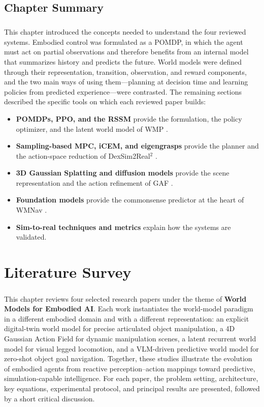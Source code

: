 \documentclass[12pt,a4paper,final]{extreport}
\begin{document}
\section{Chapter Summary}

\paragraph{} This chapter introduced the concepts needed to understand the four reviewed systems. Embodied control was formulated as a POMDP, in which the agent must act on partial observations and therefore benefits from an internal model that summarizes history and predicts the future. World models were defined through their representation, transition, observation, and reward components, and the two main ways of using them---planning at decision time and learning policies from predicted experience---were contrasted. The remaining sections described the specific tools on which each reviewed paper builds:
\begin{itemize}
  \item \textbf{POMDPs, PPO, and the RSSM} provide the formulation, the policy optimizer, and the latent world model of WMP \cite{p3}.
  \item \textbf{Sampling-based MPC, iCEM, and eigengrasps} provide the planner and the action-space reduction of DexSim2Real$^2$ \cite{p1}.
  \item \textbf{3D Gaussian Splatting and diffusion models} provide the scene representation and the action refinement of GAF \cite{p2}.
  \item \textbf{Foundation models} provide the commonsense predictor at the heart of WMNav \cite{p4}.
  \item \textbf{Sim-to-real techniques and metrics} explain how the systems are validated.
\end{itemize}


\chapter{Literature Survey}

\paragraph{}
This chapter reviews four selected research papers under the theme of \textbf{World Models for Embodied AI}.
Each work instantiates the world-model paradigm in a different embodied domain and with a different representation: an explicit digital-twin world model for precise articulated object manipulation, a 4D Gaussian Action Field for dynamic manipulation scenes, a latent recurrent world model for visual legged locomotion, and a VLM-driven predictive world model for zero-shot object goal navigation.
Together, these studies illustrate the evolution of embodied agents from reactive perception--action mappings toward predictive, simulation-capable intelligence. For each paper, the problem setting, architecture, key equations, experimental protocol, and principal results are presented, followed by a short critical discussion.
\end{document}
